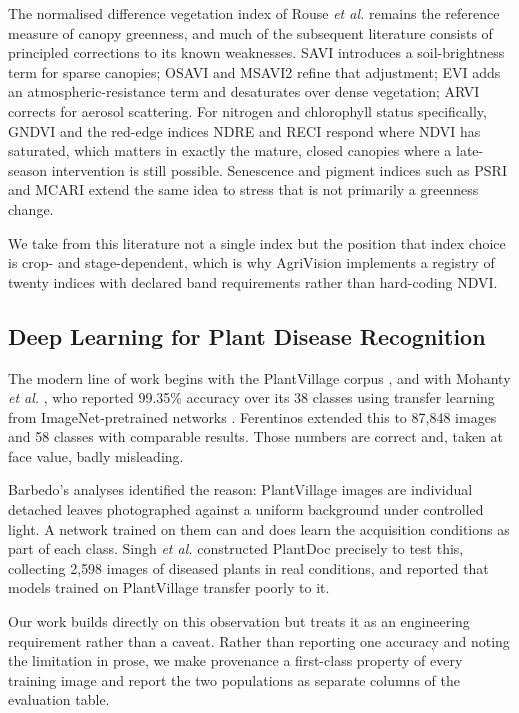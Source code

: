 \documentclass[conference]{IEEEtran}
\begin{document}
The normalised difference vegetation index of Rouse \emph{et al.}
\cite{rouse1974} remains the reference measure of canopy greenness, and much of
the subsequent literature consists of principled corrections to its known
weaknesses. SAVI \cite{huete1988} introduces a soil-brightness term for sparse
canopies; OSAVI \cite{rondeaux1996} and MSAVI2 \cite{qi1994} refine that
adjustment; EVI \cite{huete2002} adds an atmospheric-resistance term and
desaturates over dense vegetation; ARVI \cite{kaufman1992} corrects for aerosol
scattering. For nitrogen and chlorophyll status specifically, GNDVI
\cite{gitelson1996} and the red-edge indices NDRE and RECI
\cite{barnes2000,gitelson2003} respond where NDVI has saturated, which matters
in exactly the mature, closed canopies where a late-season intervention is
still possible. Senescence and pigment indices such as PSRI \cite{merzlyak1999}
and MCARI \cite{daughtry2000} extend the same idea to stress that is not
primarily a greenness change.

We take from this literature not a single index but the position that index
choice is crop- and stage-dependent, which is why AgriVision implements a
registry of twenty indices with declared band requirements rather than
hard-coding NDVI.

\subsection{Deep Learning for Plant Disease Recognition}

The modern line of work begins with the PlantVillage corpus
\cite{hughes2015}, and with Mohanty \emph{et al.} \cite{mohanty2016}, who
reported 99.35\% accuracy over its 38 classes using transfer learning from
ImageNet-pretrained networks \cite{deng2009}. Ferentinos \cite{ferentinos2018}
extended this to 87{,}848 images and 58 classes with comparable results. Those
numbers are correct and, taken at face value, badly misleading.

Barbedo's analyses \cite{barbedo2016,barbedo2018} identified the reason:
PlantVillage images are individual detached leaves photographed against a
uniform background under controlled light. A network trained on them can and
does learn the acquisition conditions as part of each class. Singh \emph{et
al.} \cite{singh2020} constructed PlantDoc precisely to test this, collecting
2{,}598 images of diseased plants in real conditions, and reported that models
trained on PlantVillage transfer poorly to it.

Our work builds directly on this observation but treats it as an engineering
requirement rather than a caveat. Rather than reporting one accuracy and noting
the limitation in prose, we make provenance a first-class property of every
training image and report the two populations as separate columns of the
evaluation table.
\end{document}
